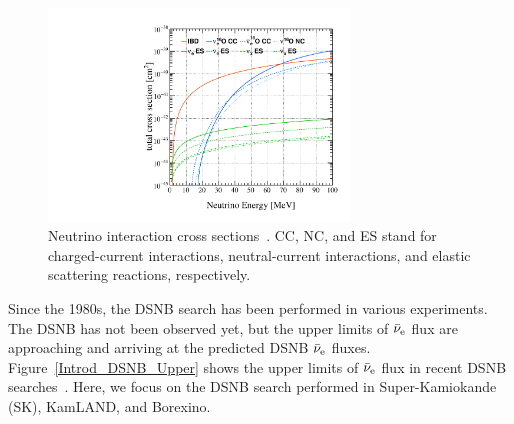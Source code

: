 
\begin{figure}[p]
	\centering
	\includegraphics[width=8cm]{Figures/Introduction/Nakanishi_XS}
	\caption[Neutrino interaction cross sections]{
	Neutrino interaction cross sections~\cite{2023NakanishiMas}.
	CC, NC, and ES stand for charged-current interactions, neutral-current interactions, and elastic scattering reactions, respectively.
	}\label{Introd_EffNeuCroSec}
\end{figure}

\hs
Since the 1980s, the DSNB search has been performed in various experiments.
The DSNB has not been observed yet, but the upper limits of $\bar{\nu}_{\rm e}$ flux are approaching and arriving at the predicted DSNB $\bar{\nu}_{\rm e}$ fluxes.
Figure~\ref{Introd_DSNB_Upper} shows the upper limits of $\bar{\nu}_{\rm e}$ flux in recent DSNB searches~\cite{2023Ando}.
Here, we focus on the DSNB search performed in Super-Kamiokande (SK), KamLAND, and Borexino.


